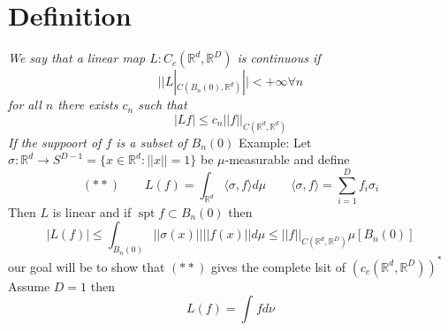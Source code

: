 \documentclass[11pt]{article}
\DeclareMathOperator{\spt}{spt}
\begin{document}
\section{Definition}
\emph{
    We say that a linear map $L : C_c( \mathbb{R}^{d}, \mathbb{R}^{D})$ is continuous if 
    \[
        ||L|_{C(B_n(0), \mathbb{R}^{d})} || < +\infty \forall n
    \] 
    for all $n$ there exists $c_n$ such that
    \[
        |Lf| \le c_n ||f||_{C( \mathbb{R}^{d}, \mathbb{R}^{d})}
    \] 
    If the suppoort of $f$ is a subset of $B_n(0)$
}
Example: Let $\sigma : \mathbb{R}^{d} \rightarrow S^{D-1} = \{x \in \mathbb{R}^{d} : ||x|| = 1\}$ be $\mu$-measurable and define
\[
    (**) \qquad L(f) = \int_{ \mathbb{R}^{d}}^{}\langle \sigma, f \rangle d \mu \qquad \langle \sigma, f \rangle = \sum_{i=1}^{D}f_i \sigma_i
\] 
Then $L$ is linear and if $\spt f \subset B_n(0)$ then 
\[
    |L(f)| \le \int_{B_n(0)}^{}||\sigma(x)||||f(x)|| d \mu \le ||f||_{C( \mathbb{R}^{d}, \mathbb{R}^{D})} \mu[B_n(0)]
\] 
our goal will be to show that $(**)$ gives the complete lsit of  $(c_c( \mathbb{R}^{d} , \mathbb{R}^{D}))^{*}$
\\
Assume $D = 1$ then
 \[
L(f) = \int_{}^{}f d \nu
\] 
\end{document}
